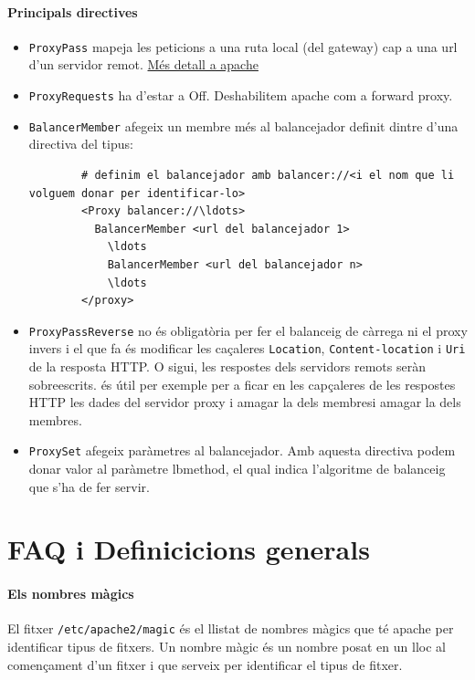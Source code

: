 \documentclass[a4paper, 11pt]{article}
\begin{document}
\paragraph{Principals directives \\}
\begin{itemize}
	\item \verb+ProxyPass+ mapeja les peticions a una ruta local (del gateway) cap a una url d'un servidor remot. \href{http://httpd.apache.org/docs/current/mod/mod_proxy.html#proxypass}{M\'es detall a apache}
	\item \verb+ProxyRequests+ ha d'estar a Off. Deshabilitem apache com a forward proxy.
	\item \verb+BalancerMember+ afegeix un membre m\'es al balancejador definit dintre d'una directiva del tipus: \\
		\begin{verbatim}
		# definim el balancejador amb balancer://<i el nom que li volguem donar per identificar-lo>
		<Proxy balancer://\ldots>
		  BalancerMember <url del balancejador 1>
			\ldots
			BalancerMember <url del balancejador n>
			\ldots
		</proxy>
		\end{verbatim}
	\item \verb+ProxyPassReverse+ no \'es obligatòria per fer el balanceig de càrrega ni el proxy invers i el que fa \'es modificar les caçaleres \verb+Location+, \verb+Content-location+ i \verb+Uri+ de la resposta HTTP. O sigui, les respostes dels servidors remots seràn sobreescrits. \'es útil per exemple per a ficar en les capçaleres de les respostes HTTP les dades del servidor proxy i amagar la dels membresi amagar la dels membres.
	\item \verb+ProxySet+ afegeix paràmetres al balancejador. Amb aquesta directiva podem donar valor al paràmetre lbmethod, el qual indica l'algoritme de balanceig que s'ha de fer servir.
\end{itemize}
 
\appendix
\section{FAQ i Definicicions generals}
\paragraph{Els nombres màgics }
El fitxer \verb+/etc/apache2/magic+ \'es el llistat de nombres màgics que t\'e apache per identificar tipus de fitxers. Un nombre màgic \'es un nombre posat en un lloc al començament d'un fitxer i que serveix per identificar el tipus de fitxer.
\end{document}
